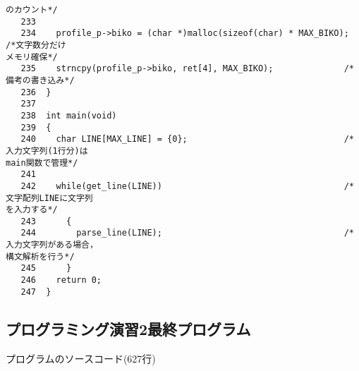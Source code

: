 \begin{Verbatim}[fontsize=\small, baselinestretch=0.8]
のカウント*/
   233	
   234	  profile_p->biko = (char *)malloc(sizeof(char) * MAX_BIKO); /*文字数分だけ
メモリ確保*/
   235	  strncpy(profile_p->biko, ret[4], MAX_BIKO);              /*備考の書き込み*/
   236	}
   237	
   238	int main(void)
   239	{
   240	  char LINE[MAX_LINE] = {0};                               /*入力文字列(1行分)は
main関数で管理*/
   241	
   242	  while(get_line(LINE))                                    /*文字配列LINEに文字列
を入力する*/
   243	    {
   244	      parse_line(LINE);                                    /*入力文字列がある場合，
構文解析を行う*/
   245	    }
   246	  return 0;
   247	}
\end{Verbatim}

\subsection{プログラミング演習2最終プログラム}\label{funclast}
プログラムのソースコード(627行)
